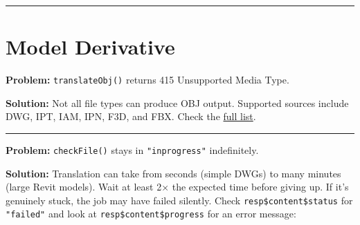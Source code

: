 \documentclass[
  11pt,
  letterpaper,
  DIV=11,
  numbers=noendperiod]{scrreprt}
\newenvironment{Shaded}{\begin{snugshade}}{\end{snugshade}}
\newcommand{\AttributeTok}[1]{\textcolor[rgb]{0.40,0.45,0.13}{#1}}
\newcommand{\CommentTok}[1]{\textcolor[rgb]{0.37,0.37,0.37}{#1}}
\newcommand{\FunctionTok}[1]{\textcolor[rgb]{0.28,0.35,0.67}{#1}}
\newcommand{\NormalTok}[1]{\textcolor[rgb]{0.00,0.23,0.31}{#1}}
\newcommand{\OtherTok}[1]{\textcolor[rgb]{0.00,0.23,0.31}{#1}}
\newcommand{\SpecialCharTok}[1]{\textcolor[rgb]{0.37,0.37,0.37}{#1}}
\begin{document}
\begin{Shaded}
\end{Shaded}

\begin{center}\rule{0.5\linewidth}{0.5pt}\end{center}

\section{Model Derivative}\label{model-derivative-2}

\textbf{Problem:} \texttt{translateObj()} returns 415 Unsupported Media
Type.

\textbf{Solution:} Not all file types can produce OBJ output. Supported
sources include DWG, IPT, IAM, IPN, F3D, and FBX. Check the
\href{https://aps.autodesk.com/en/docs/model-derivative/v2/developers_guide/supported-translations/}{full
list}.

\begin{center}\rule{0.5\linewidth}{0.5pt}\end{center}

\textbf{Problem:} \texttt{checkFile()} stays in \texttt{"inprogress"}
indefinitely.

\textbf{Solution:} Translation can take from seconds (simple DWGs) to
many minutes (large Revit models). Wait at least 2× the expected time
before giving up. If it's genuinely stuck, the job may have failed
silently. Check \texttt{resp\$content\$status} for \texttt{"failed"} and
look at \texttt{resp\$content\$progress} for an error message:

\begin{Shaded}
\end{Shaded}
\end{document}
